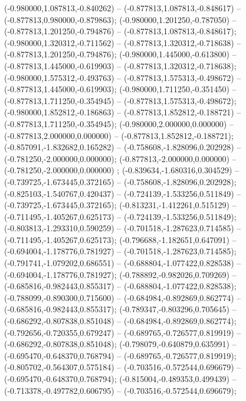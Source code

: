  (-0.980000,1.087813,-0.840262) -- (-0.877813,1.087813,-0.848617) -- (-0.877813,0.980000,-0.879863);
 (-0.980000,1.201250,-0.787050) -- (-0.877813,1.201250,-0.794876) -- (-0.877813,1.087813,-0.848617);
 (-0.980000,1.320312,-0.711562) -- (-0.877813,1.320312,-0.718638) -- (-0.877813,1.201250,-0.794876);
 (-0.980000,1.445000,-0.613800) -- (-0.877813,1.445000,-0.619903) -- (-0.877813,1.320312,-0.718638);
 (-0.980000,1.575312,-0.493763) -- (-0.877813,1.575313,-0.498672) -- (-0.877813,1.445000,-0.619903);
 (-0.980000,1.711250,-0.351450) -- (-0.877813,1.711250,-0.354945) -- (-0.877813,1.575313,-0.498672);
 (-0.980000,1.852812,-0.186863) -- (-0.877813,1.852812,-0.188721) -- (-0.877813,1.711250,-0.354945);
 (-0.980000,2.000000,0.000000) -- (-0.877813,2.000000,0.000000) -- (-0.877813,1.852812,-0.188721);
 (-0.857091,-1.832682,0.165282) -- (-0.758608,-1.828096,0.202928) -- (-0.781250,-2.000000,0.000000);
 (-0.877813,-2.000000,0.000000) -- (-0.781250,-2.000000,0.000000) ;
 (-0.839634,-1.680316,0.304529) -- (-0.739725,-1.673445,0.372165) -- (-0.758608,-1.828096,0.202928);
 (-0.825103,-1.540767,0.420437) -- (-0.724139,-1.533256,0.511849) -- (-0.739725,-1.673445,0.372165);
 (-0.813231,-1.412261,0.515129) -- (-0.711495,-1.405267,0.625173) -- (-0.724139,-1.533256,0.511849);
 (-0.803813,-1.293310,0.590259) -- (-0.701518,-1.287623,0.714585) -- (-0.711495,-1.405267,0.625173);
 (-0.796688,-1.182651,0.647091) -- (-0.694004,-1.178776,0.781927) -- (-0.701518,-1.287623,0.714585);
 (-0.791741,-1.079202,0.686551) -- (-0.688804,-1.077422,0.828538) -- (-0.694004,-1.178776,0.781927);
 (-0.788892,-0.982026,0.709269) -- (-0.685816,-0.982443,0.855317) -- (-0.688804,-1.077422,0.828538);
 (-0.788099,-0.890300,0.715600) -- (-0.684984,-0.892869,0.862774) -- (-0.685816,-0.982443,0.855317);
 (-0.789347,-0.803296,0.705645) -- (-0.686292,-0.807838,0.851048) -- (-0.684984,-0.892869,0.862774);
 (-0.792656,-0.720355,0.679247) -- (-0.689765,-0.726577,0.819919) -- (-0.686292,-0.807838,0.851048);
 (-0.798079,-0.640879,0.635991) -- (-0.695470,-0.648370,0.768794) -- (-0.689765,-0.726577,0.819919);
 (-0.805702,-0.564307,0.575184) -- (-0.703516,-0.572544,0.696679) -- (-0.695470,-0.648370,0.768794);
 (-0.815004,-0.489353,0.499439) -- (-0.713378,-0.497782,0.606795) -- (-0.703516,-0.572544,0.696679);
